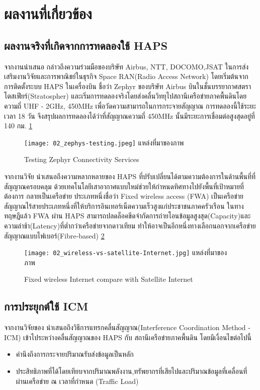 \section{ผลงานที่เกี่ยวข้อง}

\subsection{ผลงานจริงที่เกิดจากการทดลองใช้ HAPS}

จากงานนำเสนอ \cite{spacecompass}
กล่าวถึงความร่วมมือของบริษัท Airbus, NTT, DOCOMO,JSAT ในการส่งเสริมงานวิจัยและการพาณิชย์ในธุรกิจ Space RAN(Radio Access Network)
โดยเริ่มต้นจากการติดตั้งระบบ HAPS ในเครื่องบิน ชื่อว่า Zephyr ของบริษัท Airbus บินในชั้นบรรยากาศสตราโตสเฟียร์(Stratospher) 
และเริ่มการทดลองจริงโดยส่งคลื่นวิทยุไปสถานีเครือข่ายภาคพื้นดินโดยความถี่
UHF - 2GHz, 450MHz เพื่อวัดความสามารถในการกระจายสัญญาณ การทดลองนี้ใช้ระยะเวลา 18 วัน 
จึงสรุปผลการทดลองได้ว่าที่สัญญาณความถี่ 450MHz นั้นมีระยะการเชื่อมต่อสูงสุดอยู่ที่ 140 กม. \ref{fig:02-zephyr-testing}

\begin{figure}[h]
\centering
\texttt{[image: 02\_zephys-testing.jpeg]}
\hfill\small แหล่งที่มาของภาพ \cite{spacecompass}
\caption[Testing Zephyr]{Testing Zephyr Connectivity Services} \label{fig:02-zephyr-testing}
\end{figure}

จากงานวิจัย \cite{gsmatowers}
นำเสนอถึงความหลากหลายของ HAPS ที่ปรับเปลี่ยนได้ตามความต้องการในด้านพื้นที่ที่สัญญาณครอบคลุม ด้วยเทคโนโลยีเสาอากาศแบบใหม่ช่วยให้กำหนดทิศทางไปยังพื้นที่เป้าหมายที่ต้องการ กลายเป็นเครือข่าย
ประเภทหนึ่งชื่อว่า Fixed wireless access (FWA) เป็นเครือข่ายสัญญาณไร้สายประเภทหนึ่งที่ให้บริการอินเทอร์เน็ตความเร็วสูงแก่ประชาชนภาคครัวเรือน ในทางทฤษฎีแล้ว
FWA ผ่าน HAPS สามารถปลดล็อคขีดจำกัดการถ่ายโอนข้อมูลสูงสุด(Capacity)และความล่าช้า(Latency)ที่ต่ำกว่าเครือข่ายจากดาวเทียม
ทำให้อาจเป็นอีกหนึ่งทางเลือกนอกจากเครือข่ายสัญญาณแบบไฟเบอร์(Fibre-based) \ref{fig:02-wireless-vs-satellite}

\begin{figure}[h]
\centering
\texttt{[image: 02\_wireless-vs-satellite-Internet.jpg]}
\hfill\small แหล่งที่มาของภาพ \cite{fwi}
\caption[wireless vs satellite]{Fixed wireless Internet compare with Satellite Internet} \label{fig:02-wireless-vs-satellite}
\end{figure}

\subsection{การประยุกต์ใช้ ICM}

จากงานวิจัยของ \cite{liu2021interference}
นำเสนอถึงวิธีการแทรกคลื่นสัญญาณ(Interference Coordination Method - ICM) เข้าไประหว่างคลื่นสัญญาณของ HAPS กับ สถานีเครือข่ายภาคพื้นดิน โดยมีเงื่อนไขต่อไปนี้
\begin{itemize}
    \item คำนึงถึงการกระจายปริมาณรับส่งข้อมูลเป็นหลัก 
    \item ประสิทธิภาพที่ได้โดยเทียบจากปริมาณพลังงาน,ทรัพยากรที่เสียไปและปริมาณข้อมูลที่เคลื่อนที่ผ่านเครือข่าย ณ เวลาที่กำหนด (Traffic Load)
\end{itemize}
